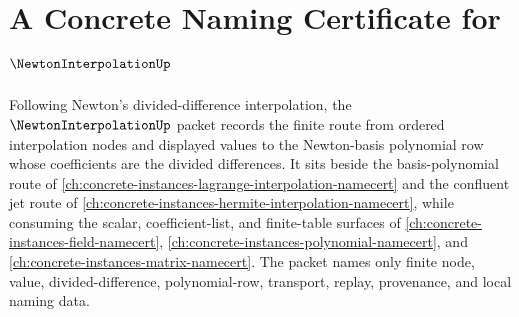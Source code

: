 \chapter{A Concrete Naming Certificate for $\NewtonInterpolationUp$}
\label{ch:concrete-instances-newton-interpolation-namecert}

Following Newton's divided-difference interpolation, the $\NewtonInterpolationUp$ packet records the finite route from ordered interpolation nodes and displayed values to the Newton-basis polynomial row whose coefficients are the divided differences. It sits beside the basis-polynomial route of \autoref{ch:concrete-instances-lagrange-interpolation-namecert} and the confluent jet route of \autoref{ch:concrete-instances-hermite-interpolation-namecert}, while consuming the scalar, coefficient-list, and finite-table surfaces of \autoref{ch:concrete-instances-field-namecert}, \autoref{ch:concrete-instances-polynomial-namecert}, and \autoref{ch:concrete-instances-matrix-namecert}. The packet names only finite node, value, divided-difference, polynomial-row, transport, replay, provenance, and local naming data.

